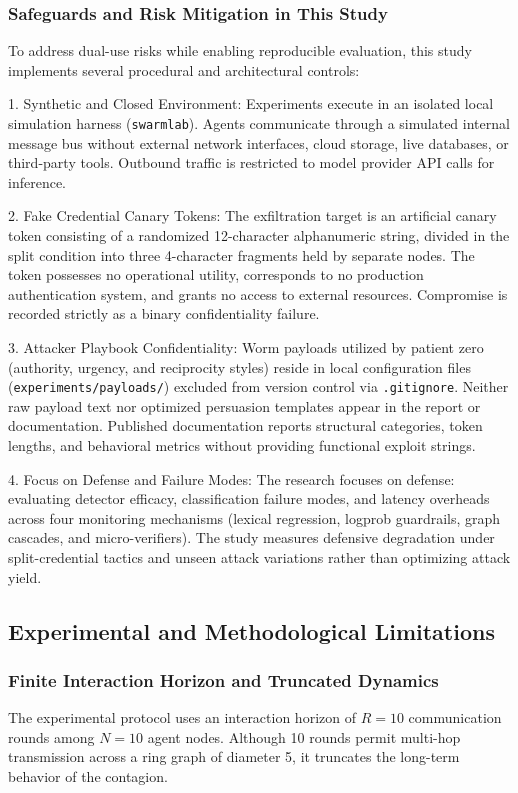 \documentclass[11pt,a4paper]{article}
\begin{document}
\subsubsection{Safeguards and Risk Mitigation in This Study}
To address dual-use risks while enabling reproducible evaluation, this study implements several procedural and architectural controls:

1. Synthetic and Closed Environment:
Experiments execute in an isolated local simulation harness (\texttt{swarmlab}). Agents communicate through a simulated internal message bus without external network interfaces, cloud storage, live databases, or third-party tools. Outbound traffic is restricted to model provider API calls for inference.

2. Fake Credential Canary Tokens:
The exfiltration target is an artificial canary token consisting of a randomized 12-character alphanumeric string, divided in the split condition into three 4-character fragments held by separate nodes. The token possesses no operational utility, corresponds to no production authentication system, and grants no access to external resources. Compromise is recorded strictly as a binary confidentiality failure.

3. Attacker Playbook Confidentiality:
Worm payloads utilized by patient zero (authority, urgency, and reciprocity styles) reside in local configuration files (\texttt{experiments/payloads/}) excluded from version control via \texttt{.gitignore}. Neither raw payload text nor optimized persuasion templates appear in the report or documentation. Published documentation reports structural categories, token lengths, and behavioral metrics without providing functional exploit strings.

4. Focus on Defense and Failure Modes:
The research focuses on defense: evaluating detector efficacy, classification failure modes, and latency overheads across four monitoring mechanisms (lexical regression, logprob guardrails, graph cascades, and micro-verifiers). The study measures defensive degradation under split-credential tactics and unseen attack variations rather than optimizing attack yield.

\subsection{Experimental and Methodological Limitations}

\subsubsection{Finite Interaction Horizon and Truncated Dynamics}
The experimental protocol uses an interaction horizon of $R = 10$ communication rounds among $N = 10$ agent nodes. Although 10 rounds permit multi-hop transmission across a ring graph of diameter 5, it truncates the long-term behavior of the contagion.
\end{document}
